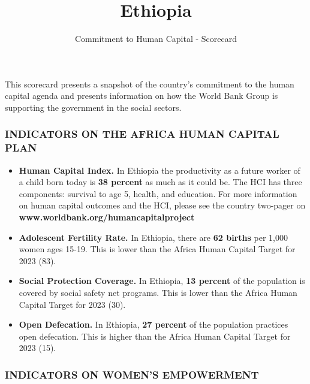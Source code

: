 \documentclass[9.2pt,twocolumn]{article}
\title{Ethiopia}
\author{Commitment to Human Capital - Scorecard}
\date{}
\begin{document}
\maketitle

\newcommand\boldblue[1]{\textcolor{bondiblue}{\textbf{#1}}}

This scorecard presents a snapshot of the country's commitment to the
human capital agenda and presents information on how the World Bank
Group is supporting the government in the social sectors.

\hypertarget{section}{%
\subsubsection{\texorpdfstring{\textcolor{bondiblue}{\textbf{I\small{NDICATORS ON THE AFRICA HUMAN CAPITAL PLAN}}}}{}}\label{section}}

\begin{itemize}
\item
  \textbf{Human Capital Index.} In Ethiopia the productivity as a future
  worker of a child born today is \textbf{38 percent} as much as it
  could be. The HCI has three components: survival to age 5, health, and
  education. For more information on human capital outcomes and the HCI,
  please see the country two-pager on
  \textcolor{bondiblue}{\textbf{www.worldbank.org/humancapitalproject}}
\item
  \textbf{Adolescent Fertility Rate.} In Ethiopia, there are \textbf{62
  births} per 1,000 women ages 15-19. This is lower than the Africa
  Human Capital Target for 2023 (83).
\item
  \textbf{Social Protection Coverage.} In Ethiopia, \textbf{13 percent}
  of the population is covered by social safety net programs. This is
  lower than the Africa Human Capital Target for 2023 (30).
\item
  \textbf{Open Defecation.} In Ethiopia, \textbf{27 percent} of the
  population practices open defecation. This is higher than the Africa
  Human Capital Target for 2023 (15).
\end{itemize}

\hypertarget{section-1}{%
\subsubsection{\texorpdfstring{\textcolor{bondiblue}{\textbf{I\small{NDICATORS ON WOMEN'S EMPOWERMENT}}}}{}}\label{section-1}}
\end{document}
